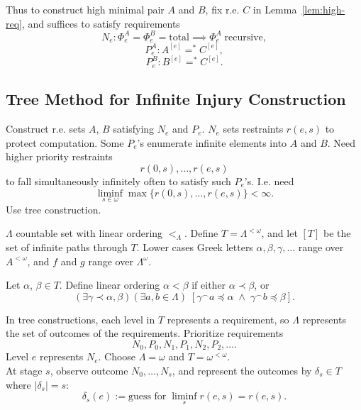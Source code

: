   Thus to construct high minimal pair $A$ and $B$, fix r.e. $C$ in
  Lemma~\ref{lem:high-req}, and suffices to satisfy requirements
  \[N_e: \Phi_e^A=\Phi_e^B=\text{total} \implies \Phi_e^A\;
  \text{recursive},\]
  \[P_e^A: A^{[e]} =^* C^{[e]},\]
  \[P_e^B: B^{[e]} =^* C^{[e]}.\]

\subsection{Tree Method for Infinite Injury Construction}
  \label{section:infinite-injury}
  Construct r.e. sets $A$, $B$ satisfying $N_e$ and $P_e$.  $N_e$ sets
  restraints $r(e,s)$ to protect computation. Some $P_e$'s enumerate
  infinite elements into $A$ and $B$. Need higher priority restraints
  \[r(0,s),\ldots,r(e,s)\]
  to fall simultaneously infinitely often to satisfy such $P_e$'s. I.e.
  need
  \begin{equation}
    \liminf_{s\in\omega} \max\{r(0,s),\ldots,r(e,s)\} <\infty.
    \label{eqn:liminf}
  \end{equation}
  Use tree construction.

  \begin{definition}
    $\Lambda$ countable set with linear ordering $<_\Lambda$. Define
    $T=\Lambda^{<\omega}$, and let $[T]$ be the set of infinite paths
    through $T$. Lower cases Greek letters $\alpha,\beta,\gamma,\ldots$
    range over $A^{<\omega}$, and $f$ and $g$ range over $\Lambda^\omega$.
  \end{definition}

  \begin{definition}
    Let $\alpha$, $\beta\in T$. Define linear ordering $\alpha<\beta$
    if either $\alpha \prec \beta$, or
    \[(\exists \gamma \prec \alpha, \beta) (\exists a,b \in \Lambda)\;
    [\gamma^\frown a \preceq\alpha\; \wedge\; \gamma^\frown b
    \preceq\beta].\]
  \end{definition}

  In tree constructions, each level in $T$ represents a requirement, so
  $\Lambda$ represents the set of outcomes of the requirements. Prioritize
  requirements
  \[N_0, P_0, N_1, P_1, N_2, P_2, \ldots.\]
  Level $e$ represents $N_e$. Choose $\Lambda=\omega$ and
  $T=\omega^{<\omega}$. \\

  At stage $s$, observe outcome $N_0,\ldots,N_s$, and represent the
  outcomes by $\delta_s\in T$ where $|\delta_s|=s$:
  \[\delta_s(e) :=\text{guess for}\; \liminf_s r(e,s) =r(e,s).\]
  
